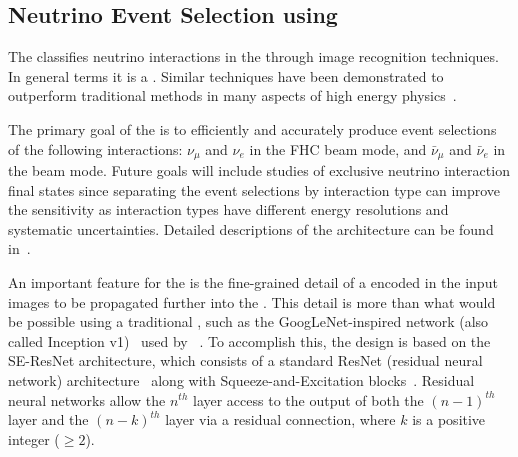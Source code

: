 
\subsection{Neutrino Event Selection using }
The   classifies neutrino interactions in the   through image recognition techniques. In general terms it is a . Similar techniques have been demonstrated to outperform traditional methods in many aspects of high energy physics~\cite{Radovic:2018dip}.

The primary goal of the  is to efficiently and accurately produce event selections of the following interactions: $\nu_{\mu}$  and $\nu_{e}$  in the FHC beam mode, and $\bar{\nu}_\mu$  and $\bar{\nu}_e$  in the  beam mode. Future goals will include studies of exclusive neutrino interaction final states since separating the event selections by interaction type can improve the sensitivity as interaction types have different energy resolutions and systematic uncertainties. Detailed descriptions of the  architecture can be found in~\cite{Aurisano:2016jvx}.

An important feature for the   is the fine-grained detail of a  encoded in the input images to be propagated further into the . This detail is more than what would be possible using a traditional , such as the GoogLeNet-inspired network (also called Inception v1)~\cite{GoogLeNet} used by ~\cite{Aurisano:2016jvx}. To accomplish this, the  design is based on the SE-ResNet architecture, which consists of a standard ResNet (residual neural network) architecture~\cite{He-et-al-2015-deep} along with Squeeze-and-Excitation blocks~\cite{Hu-et-al-2017-squeeze}. Residual neural networks allow the $n^{th}$ layer access to the output of both the $(n-1)^{th}$ layer and the $(n-k)^{th}$ layer via a residual connection, where $k$ is a positive integer ($\ge 2$).

